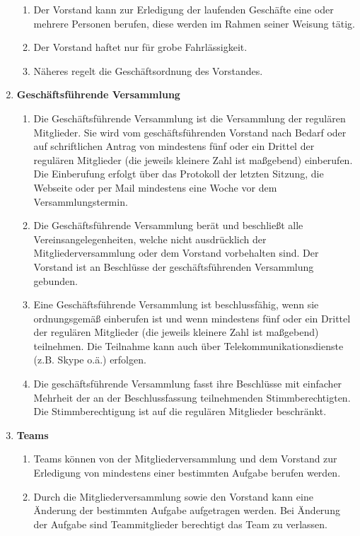 \documentclass[german]{article}
\newcommand{\paragr}[1]{\item \textsf{\textbf{#1}}}
\begin{document}
\begin{enumerate}
\begin{enumerate}
\item Der Vorstand kann zur Erledigung der laufenden Geschäfte eine oder mehrere Personen berufen, diese werden im Rahmen seiner Weisung tätig.

\item Der Vorstand haftet nur für grobe Fahrlässigkeit.

\item Näheres regelt die Geschäftsordnung des Vorstandes.

\end{enumerate}

\paragr{Geschäftsführende Versammlung}
\begin{enumerate}
\item Die Geschäftsführende Versammlung ist die Versammlung der regulären Mitglieder. Sie wird vom geschäftsführenden Vorstand nach Bedarf oder auf schriftlichen Antrag von mindestens fünf oder ein Drittel der regulären Mitglieder (die jeweils kleinere Zahl ist maßgebend) einberufen. Die Einberufung erfolgt über das Protokoll der letzten Sitzung, die Webseite oder per Mail mindestens eine Woche vor dem Versammlungstermin.
\item Die Geschäftsführende Versammlung berät und beschließt alle Vereinsangelegenheiten, welche nicht ausdrücklich der Mitgliederversammlung oder dem Vorstand vorbehalten sind. Der Vorstand ist an Beschlüsse der geschäftsführenden Versammlung gebunden.
\item Eine Geschäftsführende Versammlung ist beschlussfähig, wenn sie ordnungsgemäß einberufen ist und wenn mindestens fünf oder ein Drittel der regulären Mitglieder (die jeweils kleinere Zahl ist maßgebend) teilnehmen. Die Teilnahme kann auch über Telekommunikationsdienste (z.B. Skype o.ä.) erfolgen.
\item Die geschäftsführende Versammlung fasst ihre Beschlüsse mit einfacher Mehrheit der an der Beschlussfassung teilnehmenden Stimmberechtigten. Die Stimmberechtigung ist auf die regulären Mitglieder beschränkt.
\end{enumerate}


\paragr{Teams}
\begin{enumerate}

\item Teams können von der Mitgliederversammlung und dem Vorstand zur Erledigung von mindestens einer bestimmten Aufgabe berufen werden.

\item Durch die Mitgliederversammlung sowie den Vorstand kann eine Änderung der bestimmten Aufgabe aufgetragen werden. Bei Änderung der Aufgabe sind Teammitglieder berechtigt das Team zu verlassen.


\end{enumerate}
\end{enumerate}
\end{document}
